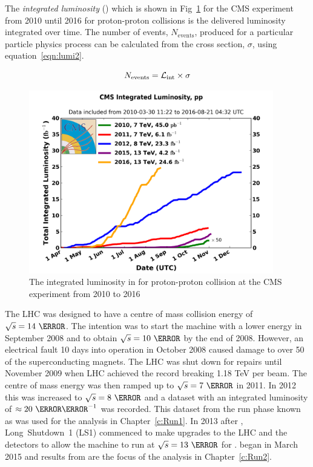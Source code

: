 The \emph{integrated luminosity} (\lumiint) which is shown in Fig~\ref{fig:Lumi} for the CMS experiment from 2010 until 2016 for proton-proton collisions is the delivered luminosity integrated over time. The number of events, $N_{\textrm{events}}$, produced for a particular particle physics process can be calculated from the cross section, $\sigma$, using equation~\ref{eqn:lumi2}.

\begin{equation}
N_{\textrm{events}} = \mathcal{L}_{\text{int}} \times \sigma
\label{eqn:lumi2}
\end{equation}

\begin{figure}[ht!]
\centering
    \includegraphics[width=0.95\textwidth]{images/int_lumi_cumulative_pp_2.png}
    \caption{The integrated luminosity in \fbinv for proton-proton collision at the CMS experiment from 2010 to 2016}
    \label{fig:Lumi}
\end{figure}

The LHC was designed to have a centre of mass collision energy of $\sqrt{s} = 14~\TeV$. The intention was to start the machine with a lower energy in September 2008 and to obtain $\sqrt{s} = 10~\TeV$ by the end of 2008. However, an electrical fault 10 days into operation in October 2008 caused damage to over 50 of the superconducting magnets. The LHC was shut down for repairs until November 2009 when LHC achieved the record breaking 1.18 TeV per beam. The centre of mass energy was then ramped up to $\sqrt{s} = 7~\TeV$ in 2011. In 2012 this was increased to $\sqrt{s} = 8~\TeV$ and a dataset with an integrated luminosity of $\approx 20~\fbinv$ was recorded. This dataset from the run phase known as \emph{\runone} was used for the analysis in Chapter~\ref{c:Run1}. In 2013 after \runone, Long~Shutdown~1 (LS1) commenced to make upgrades to the LHC and the detectors to allow the machine to run at $\sqrt{s} = 13~\TeV$ for \emph{\runtwo}. \runtwo began in March 2015 and results from \runtwo are the focus of the analysis in Chapter~\ref{c:Run2}.

